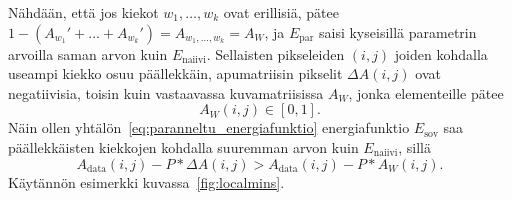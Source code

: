 Nähdään, että jos kiekot $w_1, \dots, w_k$ ovat erillisiä, pätee $1 - \left(A_{w_1}' + \dots + A_{w_k}'\right) = A_{w_1, \dots, w_k} = A_W$,
ja $E_\text{par}$ saisi kyseisillä parametrin arvoilla saman arvon kuin $E_\text{naiivi}$.
Sellaisten pikseleiden $(i,j)$ joiden kohdalla useampi kiekko osuu päällekkäin,
apumatriisin pikselit $\Delta A(i,j)$ ovat negatiivisia, toisin kuin vastaavassa kuvamatriisissa $A_W$,
jonka elementeille pätee
\begin{equation*}
    A_W(i,j) \in [0, 1].
\end{equation*}
Näin ollen yhtälön~\eqref{eq:paranneltu_energiafunktio} energiafunktio $E_\text{sov}$ saa päällekkäisten kiekkojen kohdalla suuremman arvon kuin $E_\text{naiivi}$, sillä
\begin{equation*}
    A_\text{data}(i,j) - P \ast \Delta A (i,j) > A_\text{data}(i,j) - P \ast A_W(i,j).
\end{equation*}
Käytännön esimerkki kuvassa~\ref{fig:localmins}.


